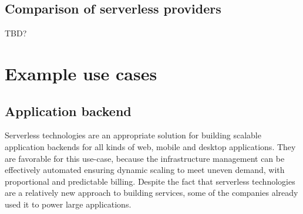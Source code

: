 \subsection{Comparison of serverless providers}

TBD?




\section{Example use cases}



\subsection{Application backend}


Serverless technologies are an appropriate solution for building scalable application backends for all kinds of web, mobile and desktop applications. They are favorable for this use-case, because the infrastructure management can be effectively automated ensuring dynamic scaling to meet uneven demand, with proportional and predictable billing. Despite the fact that serverless technologies are a relatively new approach to building services, some of the companies already used it to power large applications.

